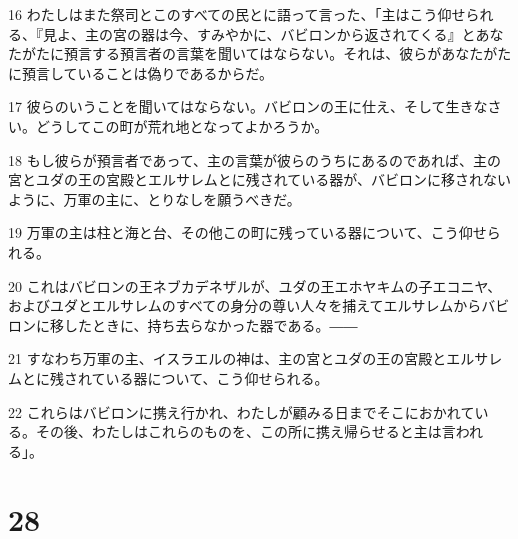 \par 16 わたしはまた祭司とこのすべての民とに語って言った、「主はこう仰せられる、『見よ、主の宮の器は今、すみやかに、バビロンから返されてくる』とあなたがたに預言する預言者の言葉を聞いてはならない。それは、彼らがあなたがたに預言していることは偽りであるからだ。
\par 17 彼らのいうことを聞いてはならない。バビロンの王に仕え、そして生きなさい。どうしてこの町が荒れ地となってよかろうか。
\par 18 もし彼らが預言者であって、主の言葉が彼らのうちにあるのであれば、主の宮とユダの王の宮殿とエルサレムとに残されている器が、バビロンに移されないように、万軍の主に、とりなしを願うべきだ。
\par 19 万軍の主は柱と海と台、その他この町に残っている器について、こう仰せられる。
\par 20 これはバビロンの王ネブカデネザルが、ユダの王エホヤキムの子エコニヤ、およびユダとエルサレムのすべての身分の尊い人々を捕えてエルサレムからバビロンに移したときに、持ち去らなかった器である。――
\par 21 すなわち万軍の主、イスラエルの神は、主の宮とユダの王の宮殿とエルサレムとに残されている器について、こう仰せられる。
\par 22 これらはバビロンに携え行かれ、わたしが顧みる日までそこにおかれている。その後、わたしはこれらのものを、この所に携え帰らせると主は言われる」。

\chapter{28}

